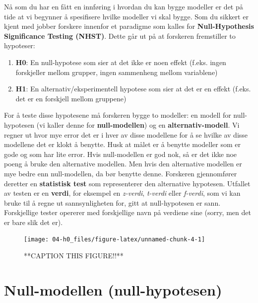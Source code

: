 \documentclass[
]{book}
\providecommand{\tightlist}{%
  \setlength{\itemsep}{0pt}\setlength{\parskip}{0pt}}
\begin{document}
Nå som du har en fått en innføring i hvordan du kan bygge modeller er det på tide at vi begynner å spesifisere hvilke modeller vi skal bygge. Som du sikkert er kjent med jobber forskere innenfor et paradigme som kalles for \textbf{Null-Hypothesis Significance Testing (NHST)}. Dette går ut på at forskeren fremstiller to hypoteser:

\begin{enumerate}
\def\labelenumi{\arabic{enumi}.}
\tightlist
\item
  \textbf{H0}: En null-hypotese som sier at det ikke er noen effekt (f.eks. ingen forskjeller mellom grupper, ingen sammenheng mellom variablene)
\item
  \textbf{H1}: En alternativ/eksperimentell hypotese som sier at det er en effekt (f.eks. det er en forskjell mellom gruppene)
\end{enumerate}

For å teste disse hypotesene må forskeren bygge to modeller: en modell for null-hypotesen (vi kaller denne for \textbf{null-modellen}) og en \textbf{alternativ-modell}. Vi regner ut hvor mye error det er i hver av disse modellene for å se hvilke av disse modellene det er klokt å benytte. Husk at målet er å benytte modeller som er gode og som har lite error. Hvis null-modellen er god nok, så er det ikke noe poeng å bruke den alternative modellen. Men hvis den alternative modellen er mye bedre enn null-modellen, da bør benytte denne. Forskeren gjennomfører deretter en \textbf{statistisk test} som representerer den alternative hypotesen. Utfallet av testen er en \textbf{verdi}, for eksempel en \emph{z-verdi}, \emph{t-verdi} eller \emph{f-verdi}, som vi kan bruke til å regne ut sannsynligheten for, gitt at null-hypotesen er sann. Forskjellige tester opererer med forskjellige navn på verdiene sine (sorry, men det er bare slik det er).

\begin{figure}

{\centering \texttt{[image: 04-h0\_files/figure-latex/unnamed-chunk-4-1]} 

}

\caption{**CAPTION THIS FIGURE!!**}\label{fig:unnamed-chunk-4}
\end{figure}

\hypertarget{null-modellen-null-hypotesen}{%
\section{Null-modellen (null-hypotesen)}\label{null-modellen-null-hypotesen}}
\end{document}

